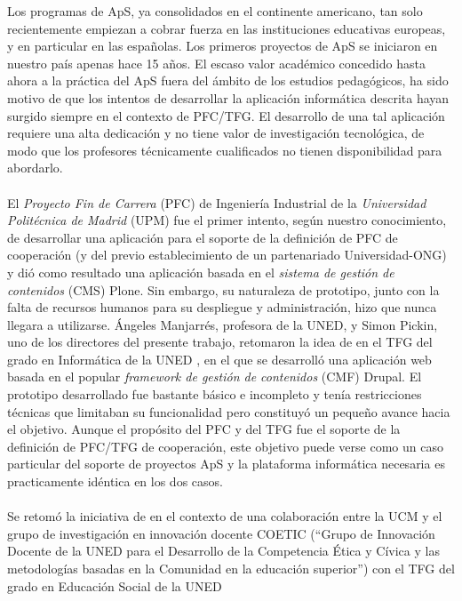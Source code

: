\documentclass[11pt]{book}
\begin{document}
Los programas de ApS, ya consolidados en el continente americano, tan
solo recientemente empiezan a cobrar fuerza en las instituciones
educativas europeas, y en particular en las españolas. Los primeros
proyectos de ApS se iniciaron en nuestro país apenas hace 15 años.  El
escaso valor académico concedido hasta ahora a la práctica del ApS fuera
del ámbito de los estudios pedagógicos, ha sido motivo de que los
intentos de desarrollar la aplicación informática descrita hayan surgido
siempre en el contexto de PFC/TFG. El desarrollo de una tal aplicación
requiere una alta dedicación y no tiene valor de investigación
tecnológica, de modo que los profesores técnicamente cualificados no
tienen disponibilidad para abordarlo.\\\\

El \emph{Proyecto Fin de Carrera} (PFC) de Ingeniería Industrial de la
\emph{Universidad Politécnica de Madrid} (UPM) \cite{ref1} fue el primer intento, según
nuestro conocimiento, de desarrollar una aplicación para el soporte de
la definición de PFC de cooperación (y del previo establecimiento de un
partenariado Universidad-ONG) y dió como resultado una aplicación basada
en el \emph{sistema de gestión de contenidos} (CMS) Plone. Sin embargo, su
naturaleza de prototipo, junto con la falta de recursos humanos para su
despliegue y administración, hizo que nunca llegara a utilizarse.
Ángeles Manjarrés, profesora de la UNED, y Simon Pickin, uno de los directores del presente
trabajo, retomaron la idea de \cite{ref1} en el TFG del grado en Informática de
la UNED \cite{ref2}, en el que se desarrolló una aplicación web basada en el
popular \emph{framework de gestión de contenidos} (CMF) Drupal. El prototipo
desarrollado fue bastante básico e incompleto y tenía restricciones
técnicas que limitaban su funcionalidad pero constituyó un pequeño
avance hacia el objetivo. Aunque el propósito del PFC \cite{ref1} y del TFG \cite{ref2}
fue el soporte de la definición de PFC/TFG de cooperación, este objetivo
puede verse como un caso particular del soporte de proyectos ApS y la
plataforma informática necesaria es practicamente idéntica en los dos casos.
\\\\
Se retomó la iniciativa de \cite{ref2} en el contexto de una colaboración entre
la UCM y el grupo de investigación en innovación docente COETIC (“Grupo
de Innovación Docente de la UNED para el Desarrollo de la Competencia
Ética y Cívica y las metodologías basadas en la Comunidad en la
educación superior”) con el TFG del grado en Educación Social de la UNED
\end{document}
